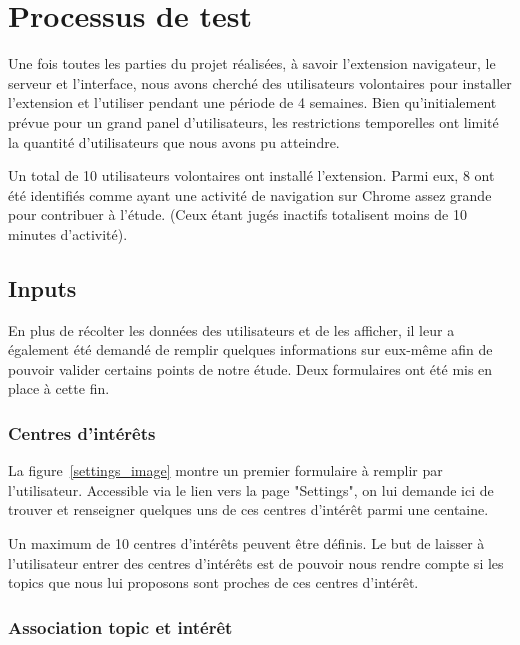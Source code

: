 
\section{Processus de test}

	Une fois toutes les parties du projet réalisées, à savoir l'extension navigateur, le serveur et l'interface, nous avons cherché des utilisateurs volontaires pour installer l'extension et l'utiliser pendant une période de 4 semaines. Bien qu'initialement prévue pour un grand panel d'utilisateurs, les restrictions temporelles ont limité la quantité d'utilisateurs que nous avons pu atteindre.

	Un total de 10 utilisateurs volontaires ont installé l'extension. Parmi eux, 8 ont été identifiés comme ayant une activité de navigation  sur Chrome assez grande pour contribuer à l'étude. (Ceux étant jugés inactifs totalisent moins de 10 minutes d'activité).

	\subsection{Inputs}

		En plus de récolter les données des utilisateurs et de les afficher, il leur a également été demandé de remplir quelques informations sur eux-même afin de pouvoir valider certains points de notre étude. Deux formulaires ont été mis en place à cette fin.

		\subsubsection{Centres d'intérêts}

			La figure~\ref{settings_image} montre un premier formulaire à remplir par l'utilisateur. Accessible via le lien vers la page "Settings", on lui demande ici de trouver et renseigner quelques uns de ces centres d'intérêt parmi une centaine.

			Un maximum de 10 centres d'intérêts peuvent être définis. Le but de laisser à l'utilisateur entrer des centres d'intérêts est de pouvoir nous rendre compte si les topics que nous lui proposons sont proches de ces centres d'intérêt.

		\subsubsection{Association topic et intérêt}

